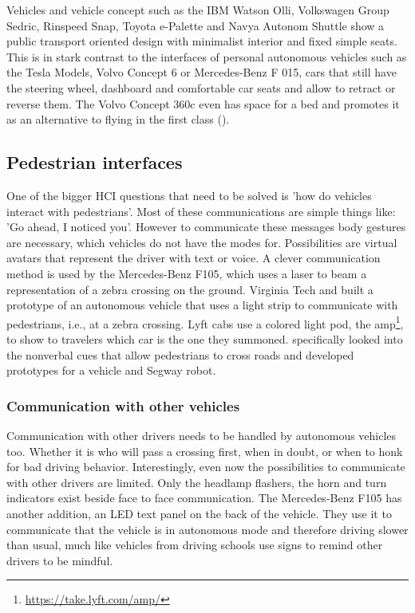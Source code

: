 Vehicles and vehicle concept such as the IBM Watson Olli, Volkswagen Group Sedric, Rinspeed Snap, Toyota e-Palette and Navya Autonom Shuttle show a public transport oriented design with minimalist interior and fixed simple seats. This is in stark contrast to the interfaces of personal autonomous vehicles such as the Tesla Models, Volvo Concept 6 or Mercedes-Benz F 015, cars that still have the steering wheel, dashboard and comfortable car seats and allow to retract or reverse them. The Volvo Concept 360c even has space for a bed and promotes it as an alternative to flying in the first class (\emph{}).   

\subsection{Pedestrian interfaces}\label{ssec:pedestrian}
One of the bigger HCI questions that need to be solved is 'how do vehicles interact with pedestrians'. Most of these communications are simple things like: 'Go ahead, I noticed you'. However to communicate these messages body gestures are necessary, which vehicles do not have the modes for. Possibilities are virtual avatars that represent the driver with text or voice.  A clever communication method is used by the Mercedes-Benz F105, which uses a laser to beam a representation of a zebra crossing on the ground. Virginia Tech and \cite{FordMotorCompany2017FordPeople} built a prototype of an autonomous vehicle that uses a light strip to communicate with pedestrians, i.e., at a zebra crossing. Lyft cabs use a colored light pod, the amp\footnote{\url{https://take.lyft.com/amp/}}, to show to travelers which car is the one they summoned. \cite{Mahadevan2018} specifically looked into the nonverbal cues that allow pedestrians to cross roads and developed prototypes for a vehicle and Segway robot. 

\subsubsection{Communication with other vehicles} 
Communication with other drivers needs to be handled by autonomous vehicles too. Whether it is who will pass a crossing first, when in doubt, or when to honk for bad driving behavior. Interestingly, even now the possibilities to communicate with other drivers are limited. Only the headlamp flashers, the horn and turn indicators exist beside face to face communication. The Mercedes-Benz F105 has another addition, an LED text panel on the back of the vehicle. They use it to communicate that the vehicle is in autonomous mode and therefore driving slower than usual, much like vehicles from driving schools use signs to remind other drivers to be mindful.  


